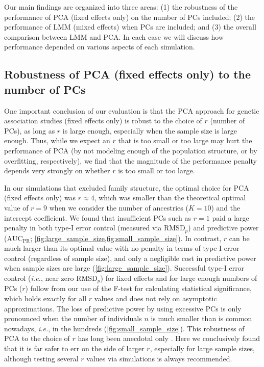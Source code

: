 \documentclass[11pt]{article}
\newcommand{\rmsd}{\text{RMSD}_p}
\newcommand{\auc}{\text{AUC}_\text{PR}}
\begin{document}

Our main findings are organized into three areas:
(1) the robustness of the performance of PCA (fixed effects only) on the number of PCs included;
(2) the performance of LMM (mixed effects) when PCs are included; and
(3) the overall comparison between LMM and PCA.
In each case we will discuss how performance depended on various aspects of each simulation.

\subsection{Robustness of PCA (fixed effects only) to the number of PCs}

One important conclusion of our evaluation is that the PCA approach for genetic association studies (fixed effects only) is robust to the choice of $r$ (number of PCs), as long as $r$ is large enough, especially when the sample size is large enough.
Thus, while we expect an $r$ that is too small or too large may hurt the performance of PCA (by not modeling enough of the population structure, or by overfitting, respectively), we find that the magnitude of the performance penalty depends very strongly on whether $r$ is too small or too large.

In our simulations that excluded family structure, the optimal choice for PCA (fixed effects only) was $r \approx 4$, which was smaller than the theoretical optimal value of $r=9$ when we consider the number of ancestries ($K=10$) and the intercept coefficient.
We found that insufficient PCs such as $r = 1$ paid a large penalty in both type-I error control (measured via $\rmsd$) and predictive power ($\auc$; \cref{fig:large_sample_size,fig:small_sample_size}).
In contrast, $r$ can be much larger than its optimal value with no penalty in terms of type-I error control (regardless of sample size), and only a negligible cost in predictive power when sample sizes are large (\cref{fig:large_sample_size}).
Successful type-I error control (\textit{i.e.}, near zero $\rmsd$) for fixed effects and for large enough numbers of PCs ($r$) follow from our use of the F-test for calculating statistical significance, which holds exactly for all $r$ values and does not rely on asymptotic approximations.
The loss of predictive power by using excessive PCs is only pronounced when the number of individuals $n$ is much smaller than is common nowadays, \textit{i.e.}, in the hundreds (\cref{fig:small_sample_size}).
This robustness of PCA to the choice of $r$ has long been anecdotal only \citep{price_principal_2006, kang_variance_2010}.
Here we conclusively found that it is far safer to err on the side of larger $r$, especially for large sample sizes, although testing several $r$ values via simulations is always recommended.
\end{document}
